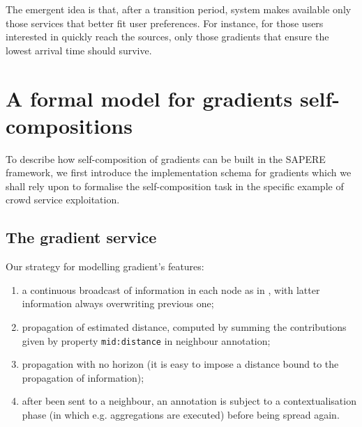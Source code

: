 \documentclass[12pt,a4paper,twoside,openright]{book}
\begin{document}
\noindent The emergent idea is that, after a transition period, system makes available only those services that better fit user preferences. For instance, for those users interested in quickly reach the sources, only those gradients that ensure the lowest arrival time should survive.


\section{A formal model for gradients self-compositions}
To describe how self-composition of gradients can be built in the SAPERE framework, we first introduce the implementation schema for gradients which we shall rely upon to formalise the self-composition task in the specific example of crowd service exploitation.

\subsection{The gradient service}
Our strategy for modelling gradient's features: 
\begin{enumerate}
 \item a continuous broadcast of information in each node as in \cite{flexiblegradients}, with latter information always overwriting previous one;
 \item propagation of estimated distance, computed by summing the contributions given by property \texttt{mid:distance} in neighbour annotation;
 \item propagation with no horizon (it is easy to impose a distance bound to the propagation of information);
 \item after been sent to a neighbour, an annotation is subject to a contextualisation phase (in which e.g. aggregations are executed) before being spread again.
\end{enumerate}
\end{document}
